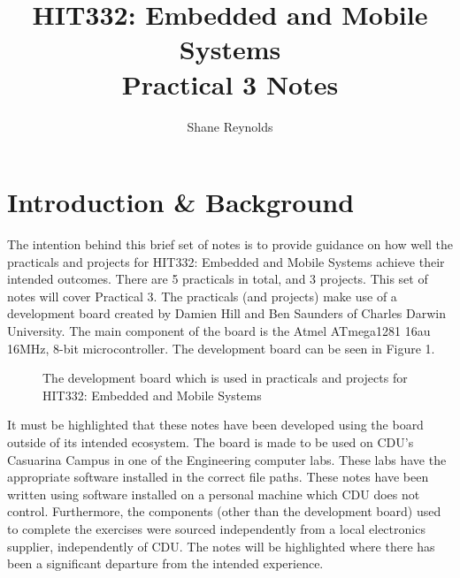 \documentclass[a4paper]{article}
\begin{document}
\title{HIT332: Embedded and Mobile Systems\\ Practical 3 Notes}
\author{Shane Reynolds}
\maketitle

\tableofcontents

\section{Introduction \& Background}
The intention behind this brief set of notes is to provide guidance on how well the practicals and projects for HIT332: Embedded and Mobile Systems achieve their intended outcomes. There are 5 practicals in total, and 3 projects. This set of notes will cover Practical 3. The practicals (and projects) make use of a development board created by Damien Hill and Ben Saunders of Charles Darwin University. The main component of the board is the Atmel ATmega1281 16au 16MHz, 8-bit microcontroller. The development board can be seen in Figure 1.

\begin{figure}[h]
	\centering
	\caption{The development board which is used in practicals and projects for HIT332: Embedded and Mobile Systems}
\end{figure}

It must be highlighted that these notes have been developed using the board outside of its intended ecosystem. The board is made to be used on CDU's Casuarina Campus in one of the Engineering computer labs. These labs have the appropriate software installed in the correct file paths. These notes have been written using software installed on a personal machine which CDU does not control. Furthermore, the components (other than the development board) used to complete the exercises were sourced independently from a local electronics supplier, independently of CDU. The notes will be highlighted where there has been a significant departure from the intended experience.
\end{document}
